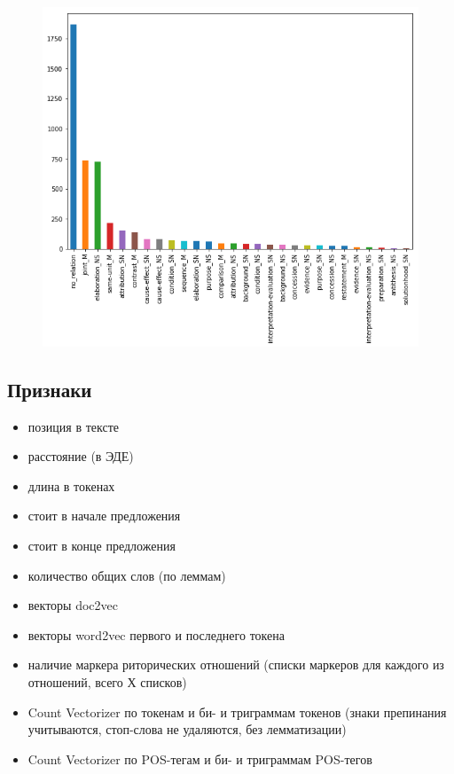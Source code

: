 \documentclass[11pt]{article}
\makeatletter
\def\maxwidth{\ifdim\Gin@nat@width>\linewidth\linewidth
    \else\Gin@nat@width\fi}
\let\Oldincludegraphics\includegraphics
\renewcommand{\includegraphics}[1]{\Oldincludegraphics[width=.8\maxwidth]{#1}}
\providecommand{\tightlist}{%
      \setlength{\itemsep}{0pt}\setlength{\parskip}{0pt}}
\makeatother
\begin{document}
\begin{figure}
\centering
\includegraphics{classes.png}
\caption{}
\end{figure}

    \subsection{Признаки}\label{ux43fux440ux438ux437ux43dux430ux43aux438}

\begin{itemize}
\tightlist
\item
  позиция в тексте
\item
  расстояние (в ЭДЕ)
\item
  длина в токенах
\item
  стоит в начале предложения
\item
  стоит в конце предложения
\item
  количество общих слов (по леммам)
\item
  векторы doc2vec\\
\item
  векторы word2vec первого и последнего токена
\item
  наличие маркера риторических отношений (списки маркеров для каждого из
  отношений, всего Х списков)
\item
  Count Vectorizer по токенам и би- и триграммам токенов (знаки
  препинания учитываются, стоп-слова не удаляются, без лемматизации)
\item
  Count Vectorizer по POS-тегам и би- и триграммам POS-тегов
\end{itemize}
\end{document}
